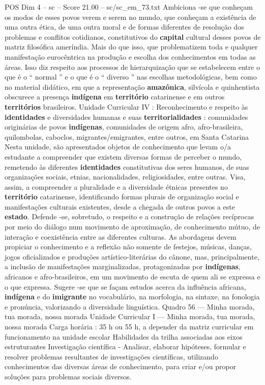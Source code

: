 \begin{textsample}{POS Dim 4 – sc – Score 21.00 – sc/sc\_em\_73.txt}
Ambiciona -se que conheçam os modos de esses povos verem e serem no mundo, que conheçam a existência de uma outra ética, de uma outra moral e de formas diferentes de resolução dos problemas e conflitos cotidianos, constitutivos do \textbf{capital} cultural desses povos de matriz filosófica ameríndia.
Mais do que isso, que problematizem toda e qualquer manifestação eurocêntrica na produção e escolha dos conhecimentos em todas as áreas.
Isso diz respeito aos processos de hierarquização que se estabelecem entre o que é o “ normal ” e o que é o “ diverso ” nas escolhas metodológicas, bem como no material didático, em que a representação \textbf{amazônica}, silvícola e quinhentista obscurece a presença \textbf{indígena} em \textbf{território} catarinense e em outros \textbf{territórios} brasileiros.
Unidade Curricular IV : Reconhecimento e respeito às \textbf{identidades} e diversidades humanas e suas \textbf{territorialidades} : comunidades originárias de povos \textbf{indígenas}, comunidades de origem afro, afro-brasileira, quilombolas, caboclos, migrantes/emigrantes, entre outros, em Santa Catarina Nesta unidade, são apresentados objetos de conhecimento que levam o/a estudante a compreender que existem diversas formas de perceber o mundo, remetendo às diferentes \textbf{identidades} constitutivas dos seres humanos, de suas organizações sociais, etnias, nacionalidades, religiosidades, entre outras.
Visa, assim, a compreender a pluralidade e a diversidade étnicas presentes no \textbf{território} catarinense, identificando formas plurais de organização social e manifestações culturais existentes, desde a chegada de outros povos a este \textbf{estado}.
Defende -se, sobretudo, o respeito e a construção de relações recíprocas por meio do diálogo num movimento de aproximação, de conhecimento mútuo, de interação e coexistência entre as diferentes culturas.
As abordagens devem propiciar o conhecimento e a reflexão não somente de festejos, músicas, danças, jogos oficializados e produções artístico-literárias do cânone, mas, principalmente, a inclusão de manifestações marginalizadas, protagonizadas por \textbf{indígenas}, africanos e afro-brasileiros, em um movimento de escuta de quem ali se expressa e o que expressa.
Sugere -se que se façam estudos acerca da influência africana, \textbf{indígena} e do \textbf{imigrante} no vocabulário, na morfologia, na sintaxe, na fonologia e pronúncia, valorizando a diversidade linguística.
Quadro 56 — Minha morada, tua morada, nossa morada Unidade Curricular I — Minha morada, tua morada, nossa morada Carga horária : 35 h ou 55 h, a depender da matriz curricular em funcionamento na unidade escolar Habilidades da trilha associadas aos eixos estruturantes Investigação científica - Analisar, elaborar hipóteses, formular e resolver problemas resultantes de investigações científicas, utilizando conhecimentos das diversas áreas de conhecimento, para criar e/ou propor soluções para problemas sociais diversos.

\end{textsample}

